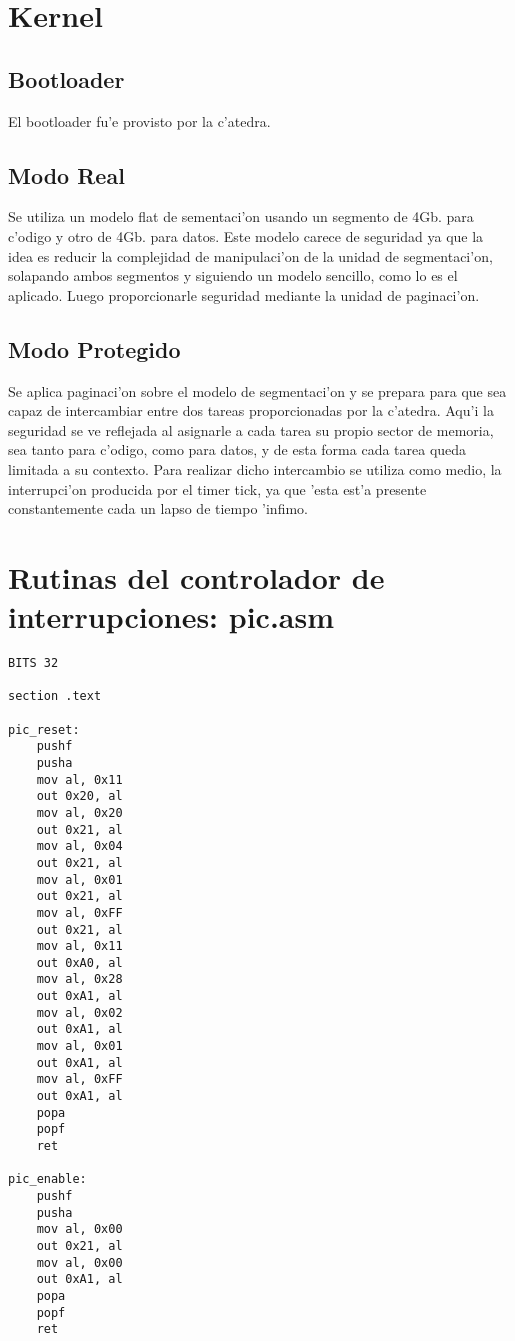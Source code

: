 \documentclass[11pt]{article}
\begin{document}
\section{Kernel}
\subsection{Bootloader} El bootloader fu'e provisto por la c'atedra.
\subsection{Modo Real}
Se utiliza un modelo flat de sementaci'on usando un segmento de 4Gb. para c'odigo y otro de 4Gb. para datos. Este modelo carece de seguridad ya que la idea es reducir la complejidad de manipulaci'on de la unidad de segmentaci'on, solapando ambos segmentos y siguiendo un modelo sencillo, como lo es el aplicado. Luego proporcionarle seguridad mediante la unidad de paginaci'on.
\subsection{Modo Protegido}
Se aplica paginaci'on sobre el modelo de segmentaci'on y se prepara para que sea capaz de intercambiar entre dos tareas proporcionadas por la c'atedra. Aqu'i la seguridad se ve reflejada al asignarle a cada tarea su propio sector de memoria, sea tanto para c'odigo, como para datos, y de esta forma cada tarea queda limitada a su contexto. Para realizar dicho intercambio se utiliza como medio, la interrupci'on producida por el timer tick, ya que 'esta est'a presente constantemente cada un lapso de tiempo 'infimo.

\newpage

\section{Rutinas del controlador de interrupciones: pic.asm}
\begin{lstlisting}[frame=single]
BITS 32

section .text

pic_reset:
	pushf
	pusha
	mov	al, 0x11
	out	0x20, al
	mov	al, 0x20
	out	0x21, al
	mov	al, 0x04
	out	0x21, al
	mov	al, 0x01
	out	0x21, al
	mov	al, 0xFF
	out	0x21, al
	mov	al, 0x11
	out	0xA0, al
	mov	al, 0x28
	out	0xA1, al
	mov	al, 0x02
	out	0xA1, al
	mov	al, 0x01
	out	0xA1, al
	mov	al, 0xFF
	out	0xA1, al
	popa
	popf
	ret

pic_enable:
	pushf
	pusha
	mov	al, 0x00
	out	0x21, al
	mov	al, 0x00
	out	0xA1, al
	popa
	popf
	ret
\end{lstlisting}
\end{document}

